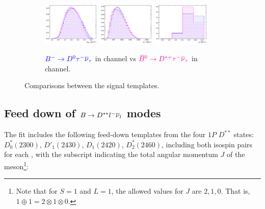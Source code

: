 \begin{figure}[!htb]
    \begin{subfigure}{\textwidth}
        \centering
        \includegraphics[width=0.3\textwidth]{figs-fit-fit-templates/histo-comp/D0_iso_D0Tau__vs__Dst_iso_DstTau__m2miss.pdf}
        \includegraphics[width=0.3\textwidth]{figs-fit-fit-templates/histo-comp/D0_iso_D0Tau__vs__Dst_iso_DstTau__el.pdf}
        \includegraphics[width=0.3\textwidth]{figs-fit-fit-templates/histo-comp/D0_iso_D0Tau__vs__Dst_iso_DstTau__q2.pdf}

        \caption{
            $\textcolor{blue}{{{{B}^-}} \rightarrow {\ensuremath{{D}^0}}{\ensuremath{\tau^-}}{\ensuremath{{\overline{\nu}}_\tau}}}$
            in \Dz channel
            vs
            $\textcolor{magenta}{{{\kern 0.18em\overline{\kern -0.18em B}}{}^0} \rightarrow {\ensuremath{{D}^{*+}}}{\ensuremath{\tau^-}}{\ensuremath{{\overline{\nu}}_\tau}}}$
            in \Dstar channel.
        }
    \end{subfigure}
    \caption{Comparisons between the signal templates.}
    \label{fig:d0-sig-vs-dst-sig}
\end{figure}


\subsection{Feed down of $B \rightarrow D^{**}{l^-}{{\overline{\nu}}_l}$ modes}
\label{tmpl:dstst}

The fit includes the following feed-down templates from the four $1P$ $D^{**}$
states: $D_0^*(2300)$, $D'_1(2430)$, $D_1(2420)$, $D_2^*(2460)$,
including both isospin pairs for each \Dstst,
with the subscript indicating the total angular momentum $J$ of the
meson\footnote{
    Note that for $S = 1$ and $L = 1$, the allowed values for $J$ are
    $2, 1, 0$.
    That is, $1 \oplus 1 = 2 \otimes 1 \otimes 0$.
}:

